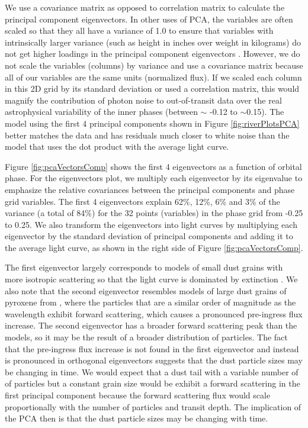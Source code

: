 \documentclass[preprint,trackchanges]{aastex61}
\begin{document}
We use a covariance matrix as opposed to correlation matrix to calculate the principal component eigenvectors.
In other uses of PCA, the variables are often scaled so that they all have a variance of 1.0 to ensure that variables with intrinsically larger variance (such as height in inches over weight in kilograms) do not get higher loadings in the principal component eigenvectors \citep{jolliffe2002pca}.
However, we do not scale the variables (columns) by variance and use a covariance matrix because all of our variables are the same units (normalized flux).
If we scaled each column in this 2D grid by its standard deviation or used a correlation matrix, this would magnify the contribution of photon noise to out-of-transit data over the real astrophysical variability of the inner phases (between $\sim$ -0.12 to $\sim$0.15).
The model using the first 4 principal components shown in Figure \ref{fig:riverPlotsPCA} better matches the data and has residuals much closer to white noise than the model that uses the dot product with the average light curve.

Figure \ref{fig:pcaVectorsComp} shows the first 4 eigenvectors as a function of orbital phase.
For the eigenvectors plot, we multiply each eigenvector by its eigenvalue to emphasize the relative covariances between the principal components and phase grid variables.
The first 4 eigenvectors explain 62\%, 12\%, 6\% and 3\% of the variance (a total of 84\%) for the 32 points (variables) in the phase grid from -0.25 to 0.25.
We also transform the eigenvectors into light curves by multiplying each eigenvector by the standard deviation of principal components and adding it to the average light curve, as shown in the right side of Figure \ref{fig:pcaVectorsComp}.

The first eigenvector largely corresponds to models of small dust grains with more isotropic scattering so that the light curve is dominated by extinction \citep{budaj12,brogi2012}.
We also note that the second eigenvector resembles models of large dust grains of pyroxene from \citet{budaj12}, where the particles that are a similar order of magnitude as the wavelength exhibit forward scattering, which causes a pronounced pre-ingress flux increase.
The second eigenvector has a broader forward scattering peak than the \citet{budaj12} models, so it may be the result of a broader distribution of particles.
The fact that the pre-ingress flux increase is not found in the first eigenvector and instead is pronounced in orthogonal eigenvectors suggests that the dust particle sizes may be changing in time.
We would expect that a dust tail with a variable number of of particles but a constant grain size would be exhibit a forward scattering in the first principal component because the forward scattering flux would scale proportionally with the number of particles and transit depth.
The implication of the PCA then is that the dust particle sizes may be changing with time.
\end{document}
